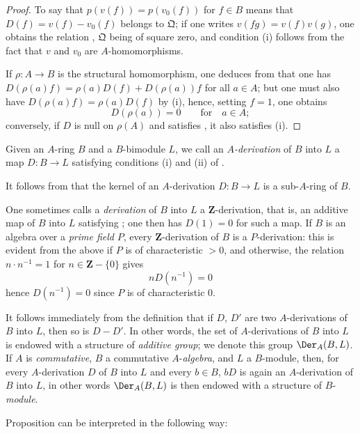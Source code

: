 \begin{proof}
To say that $p(v(f))=p(v_0(f))$ for $f\in B$ means that $D(f)=v(f)-v_0(f)$ belongs to $\mathfrak{Q}$; if one writes $v(fg)=v(f)v(g)$, one obtains the relation , $\mathfrak{Q}$ being of square zero, and condition (i) follows from the fact that $v$ and $v_0$ are $A$-homomorphisms.

If $\rho:A\to B$ is the structural homomorphism, one deduces from  that one has $D(\rho(a)f)=\rho(a)D(f)+D(\rho(a))f$ for all $a\in A$; but one must also have $D(\rho(a)f)=\rho(a)D(f)$ by (i), hence, setting $f=1$, one obtains
\[
  D(\rho(a)) = 0 \qquad\text{for}\quad a\in A;
\]
conversely, if $D$ is null on $\rho(A)$ and satisfies , it also satisfies (i).
\end{proof}

\begin{definition}[20.1.2]
\label{0.20.1.2}
Given an $A$-ring $B$ and a $B$-bimodule $L$, we call an \emph{$A$-derivation} of $B$ into $L$ a map $D:B\to L$ satisfying conditions (i) and (ii) of .
\end{definition}

It follows from  that the kernel of an $A$-derivation $D:B\to L$ is a sub-$A$-ring of $B$.

One sometimes calls a \emph{derivation} of $B$ into $L$ a $\mathbf{Z}$-derivation, that is, an additive map of $B$ into $L$ satisfying ; one then has $D(1)=0$ for such a map.
If $B$ is an algebra over a \emph{prime field} $P$, every $\mathbf{Z}$-derivation of $B$ is a $P$-derivation: this is evident from the above if $P$ is of characteristic $>0$, and otherwise, the relation $n\cdot n^{-1}=1$ for $n\in\mathbf{Z}-\{0\}$ gives
\[
  nD(n^{-1}) = 0
\]
hence $D(n^{-1})=0$ since $P$ is of characteristic $0$.

It follows immediately from the definition  that if $D$, $D'$ are two $A$-derivations of $B$ into $L$, then so is $D-D'$.
In other words, the set of $A$-derivations of $B$ into $L$ is endowed with a structure of \emph{additive group}; we denote this group $\Der_A(B,L)$.
If $A$ is \emph{commutative}, $B$ a commutative $A$-\emph{algebra}, and $L$ a $B$-module, then, for every $A$-derivation $D$ of $B$ into $L$ and every $b\in B$, $bD$ is again an $A$-derivation of $B$ into $L$, in other words $\Der_A(B,L)$ is then endowed with a structure of $B$-\emph{module}.

Proposition  can be interpreted in the following way:


